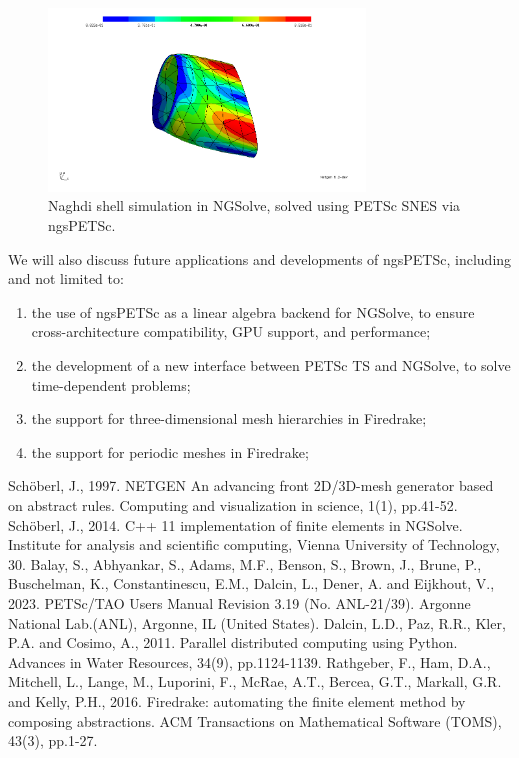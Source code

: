 \documentclass[a4paper,11pt]{article}
\begin{document}
\begin{figure}[h]
    \centering
    \includegraphics[width=0.75\textwidth]{../figures/naghdi.jpg}
    \caption{Naghdi shell simulation in NGSolve, solved using PETSc SNES via ngsPETSc.}
    \label{fig:ngsPETSc}
\end{figure}
We will also discuss future applications and developments of ngsPETSc, including and not limited to:
\begin{enumerate}
    \item the use of ngsPETSc as a linear algebra backend for NGSolve, to ensure cross-architecture compatibility, GPU support, and performance;
    \item the development of a new interface between PETSc TS and NGSolve, to solve time-dependent problems;
    \item the support for three-dimensional mesh hierarchies in Firedrake;
    \item the support for periodic meshes in Firedrake; 
\end{enumerate}
\begin{thebibliography}{9.}
\frenchspacing
{}Schöberl, J., 1997. NETGEN An advancing front 2D/3D-mesh generator based on abstract rules. Computing and visualization in science, 1(1), pp.41-52.
Schöberl, J., 2014. C++ 11 implementation of finite elements in NGSolve. Institute for analysis and scientific computing, Vienna University of Technology, 30.
Balay, S., Abhyankar, S., Adams, M.F., Benson, S., Brown, J., Brune, P., Buschelman, K., Constantinescu, E.M., Dalcin, L., Dener, A. and Eijkhout, V., 2023. PETSc/TAO Users Manual Revision 3.19 (No. ANL-21/39). Argonne National Lab.(ANL), Argonne, IL (United States).
Dalcin, L.D., Paz, R.R., Kler, P.A. and Cosimo, A., 2011. Parallel distributed computing using Python. Advances in Water Resources, 34(9), pp.1124-1139.
Rathgeber, F., Ham, D.A., Mitchell, L., Lange, M., Luporini, F., McRae, A.T., Bercea, G.T., Markall, G.R. and Kelly, P.H., 2016. Firedrake: automating the finite element method by composing abstractions. ACM Transactions on Mathematical Software (TOMS), 43(3), pp.1-27.
\end{thebibliography}

\end{document}
